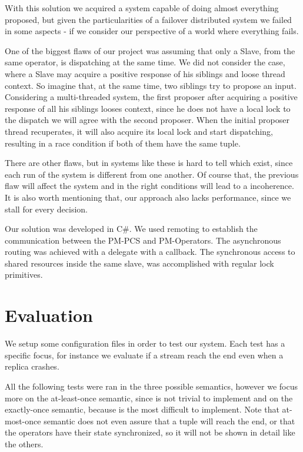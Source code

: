 \documentclass[times, 10pt,twocolumn]{article}
\begin{document}

With this solution we acquired a system capable of doing almost everything proposed, but given the particularities of a failover distributed system we failed in some aspects - if we consider our perspective of a world where everything fails. 

One of the biggest flaws of our project was assuming that only a Slave, from the same operator, is dispatching at the same time. We did not consider the case, where a Slave may acquire a positive response of his siblings and loose thread context. So imagine that, at the same time, two siblings try to propose an input. Considering a multi-threaded system, the first proposer after acquiring a positive response of all his siblings looses context, since he does not have a local lock to the dispatch we will agree with the second proposer. When the initial proposer thread recuperates, it will also acquire its local lock and start dispatching, resulting in a race condition if both of them have the same tuple.

There are other flaws, but in systems like these is hard to tell which exist, since each run of the system is different from one another. Of course that, the previous flaw will affect the system and in the right conditions will lead to a incoherence. It is also worth mentioning that, our approach also lacks performance, since we stall for every decision.


Our solution was developed in C\#. We used remoting to establish the communication between the PM-PCS and PM-Operators. The asynchronous routing was achieved with a delegate with a callback. The synchronous access to shared resources inside the same slave, was accomplished with regular lock primitives.

\section{Evaluation}

We setup some configuration files in order to test our system. Each test 
has a specific focus, for instance we evaluate if a stream reach the end even when 
a replica crashes.

All the following tests were ran in the three possible semantics, however we focus more on the at-least-once semantic, since is not trivial to implement and on the exactly-once semantic, because is the most difficult to implement. Note that at-most-once semantic does not even assure that a tuple will reach the end, or that the operators have their state synchronized, so it will not be shown in detail like the others. 
\end{document}
